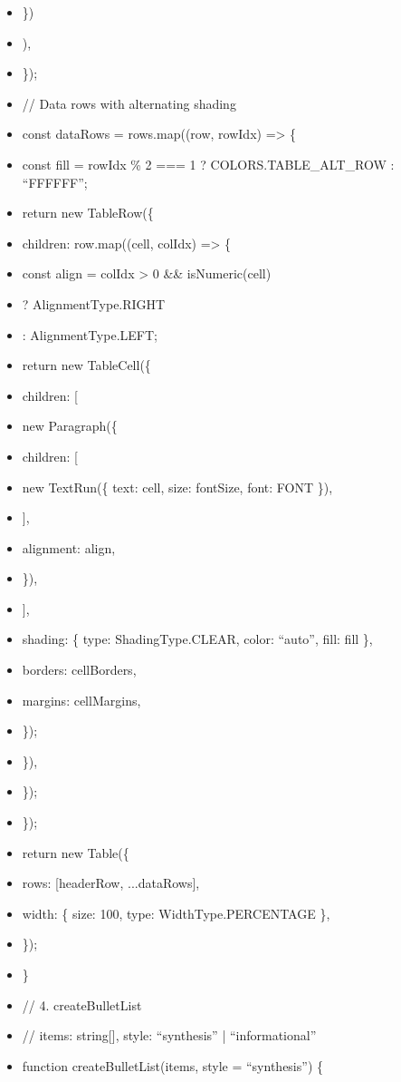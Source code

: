 \documentclass[11pt]{article}
\begin{document}
\begin{itemize}[leftmargin=*,itemsep=2pt,topsep=2pt]
\item {} \})
\item {} ),
\item {} \});
\item {} // Data rows with alternating shading
\item {} const dataRows = rows.map((row, rowIdx) => \{
\item {} const fill = rowIdx \% 2 === 1 ? COLORS.TABLE\_\allowbreak{}ALT\_\allowbreak{}ROW : ``FFFFFF'';
\item {} return new TableRow(\{
\item {} children: row.map((cell, colIdx) => \{
\item {} const align = colIdx > 0 \&\& isNumeric(cell)
\item {} ? AlignmentType.RIGHT
\item {} : AlignmentType.LEFT;
\item {} return new TableCell(\{
\item {} children: [
\item {} new Paragraph(\{
\item {} children: [
\item {} new TextRun(\{ text: cell, size: fontSize, font: FONT \}),
\item {} ],
\item {} alignment: align,
\item {} \}),
\item {} ],
\item {} shading: \{ type: ShadingType.CLEAR, color: ``auto'', fill: fill \},
\item {} borders: cellBorders,
\item {} margins: cellMargins,
\item {} \});
\item {} \}),
\item {} \});
\item {} \});
\item {} return new Table(\{
\item {} rows: [headerRow, ...dataRows],
\item {} width: \{ size: 100, type: WidthType.PERCENTAGE \},
\item {} \});
\item {} \}
\item {} // 4. createBulletList
\item {} // items: string[], style: ``synthesis'' | ``informational''
\item {} function createBulletList(items, style = ``synthesis'') \{

\end{itemize}
\end{document}
